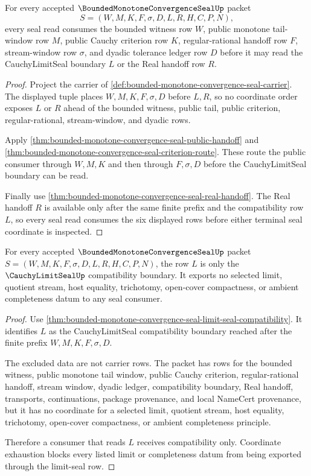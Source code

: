 \begin{theorem}
\label{thm:bounded-monotone-convergence-seal-tail-window-consumption}
For every accepted $\BoundedMonotoneConvergenceSealUp$ packet
$$
S=(W,M,K,F,\sigma,D,L,R,H,C,P,N),
$$
every seal read consumes the bounded witness row $W$, public monotone tail-window row $M$, public Cauchy criterion row $K$, regular-rational handoff row $F$, stream-window row $\sigma$, and dyadic tolerance ledger row $D$ before it may read the CauchyLimitSeal boundary $L$ or the Real handoff row $R$.
\end{theorem}
\begin{proof}
Project the carrier of \autoref{def:bounded-monotone-convergence-seal-carrier}. The displayed tuple places $W,M,K,F,\sigma,D$ before $L,R$, so no coordinate order exposes $L$ or $R$ ahead of the bounded witness, public tail, public criterion, regular-rational, stream-window, and dyadic rows.

Apply \autoref{thm:bounded-monotone-convergence-seal-public-handoff} and \autoref{thm:bounded-monotone-convergence-seal-criterion-route}. These route the public consumer through $W,M,K$ and then through $F,\sigma,D$ before the CauchyLimitSeal boundary can be read.

Finally use \autoref{thm:bounded-monotone-convergence-seal-real-handoff}. The Real handoff $R$ is available only after the same finite prefix and the compatibility row $L$, so every seal read consumes the six displayed rows before either terminal seal coordinate is inspected.
\end{proof}

\begin{theorem}
\label{thm:bounded-monotone-convergence-seal-limit-refusal-exhaustion}
For every accepted $\BoundedMonotoneConvergenceSealUp$ packet $S=(W,M,K,F,\sigma,D,L,R,H,C,P,N)$, the row $L$ is only the $\CauchyLimitSealUp$ compatibility boundary. It exports no selected limit, quotient stream, host equality, trichotomy, open-cover compactness, or ambient completeness datum to any seal consumer.
\end{theorem}
\begin{proof}
Use \autoref{thm:bounded-monotone-convergence-seal-limit-seal-compatibility}. It identifies $L$ as the CauchyLimitSeal compatibility boundary reached after the finite prefix $W,M,K,F,\sigma,D$.

The excluded data are not carrier rows. The packet has rows for the bounded witness, public monotone tail window, public Cauchy criterion, regular-rational handoff, stream window, dyadic ledger, compatibility boundary, Real handoff, transports, continuations, package provenance, and local NameCert provenance, but it has no coordinate for a selected limit, quotient stream, host equality, trichotomy, open-cover compactness, or ambient completeness principle.

Therefore a consumer that reads $L$ receives compatibility only. Coordinate exhaustion blocks every listed limit or completeness datum from being exported through the limit-seal row.
\end{proof}


